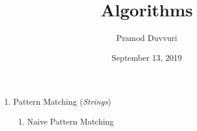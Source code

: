 \documentclass[11pt]{article}
\title{Algorithms}
\author{Pramod Duvvuri}
\date{September 13, 2019}
\begin{document}
	\maketitle
	\begin{enumerate} 
		\item Pattern Matching (\textit{Strings})
		\begin{enumerate}
			\item Naive Pattern Matching
		\end{enumerate}
	\end{enumerate}
\end{document}
